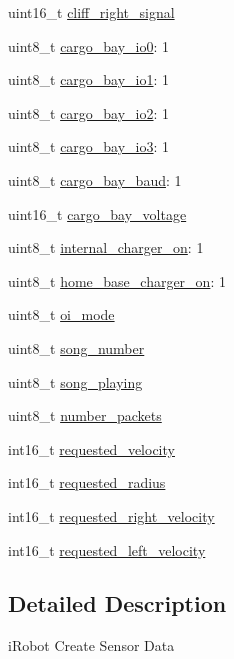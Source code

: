 \begin{DoxyCompactItemize}
uint16\-\_\-t \hyperlink{structoi__t_a4d802611ff279eaaedc2ececd247c6aa}{cliff\-\_\-right\-\_\-signal}
\item 
uint8\-\_\-t \hyperlink{structoi__t_a6387a1941ae56857f08fd7934359fbee}{cargo\-\_\-bay\-\_\-io0}\-: 1
\item 
uint8\-\_\-t \hyperlink{structoi__t_ae9f741f3e20513d1d0ef36db4fbc0000}{cargo\-\_\-bay\-\_\-io1}\-: 1
\item 
uint8\-\_\-t \hyperlink{structoi__t_a0c3a9b28f06023b7ac0672c0062dbb4e}{cargo\-\_\-bay\-\_\-io2}\-: 1
\item 
uint8\-\_\-t \hyperlink{structoi__t_a87c2539a75dacc08e2e31f970a394563}{cargo\-\_\-bay\-\_\-io3}\-: 1
\item 
uint8\-\_\-t \hyperlink{structoi__t_a40ef847b9f09a4de8c1a581080fac9fb}{cargo\-\_\-bay\-\_\-baud}\-: 1
\item 
uint16\-\_\-t \hyperlink{structoi__t_a05fc9cd57a01ab540d2bfc01534748cc}{cargo\-\_\-bay\-\_\-voltage}
\item 
uint8\-\_\-t \hyperlink{structoi__t_aad311b6f1703e0b9de4ed6b48bde2088}{internal\-\_\-charger\-\_\-on}\-: 1
\item 
uint8\-\_\-t \hyperlink{structoi__t_a30fd94d2cc9a90b7906e7a02cd7e72a4}{home\-\_\-base\-\_\-charger\-\_\-on}\-: 1
\item 
uint8\-\_\-t \hyperlink{structoi__t_acf21746437f5f6d8c77ef42011e93f39}{oi\-\_\-mode}
\item 
uint8\-\_\-t \hyperlink{structoi__t_a6df9649ca8109a9be7a3d9945a2078e9}{song\-\_\-number}
\item 
uint8\-\_\-t \hyperlink{structoi__t_a749668ebbf205a0097f94e10b1c3b998}{song\-\_\-playing}
\item 
uint8\-\_\-t \hyperlink{structoi__t_a5167e02f9f0dea9153cef2faccb39705}{number\-\_\-packets}
\item 
int16\-\_\-t \hyperlink{structoi__t_ab07703d93cf99cf70dc13c805249a22c}{requested\-\_\-velocity}
\item 
int16\-\_\-t \hyperlink{structoi__t_a2820e0585e708b4699767e7b113d3759}{requested\-\_\-radius}
\item 
int16\-\_\-t \hyperlink{structoi__t_a385341db67f1aacf7936c8cd68ea0363}{requested\-\_\-right\-\_\-velocity}
\item 
int16\-\_\-t \hyperlink{structoi__t_a35a41f3d6028452fdc6d5eb3ee7ebbbf}{requested\-\_\-left\-\_\-velocity}
\end{DoxyCompactItemize}


\subsection{Detailed Description}
i\-Robot Create Sensor Data 

